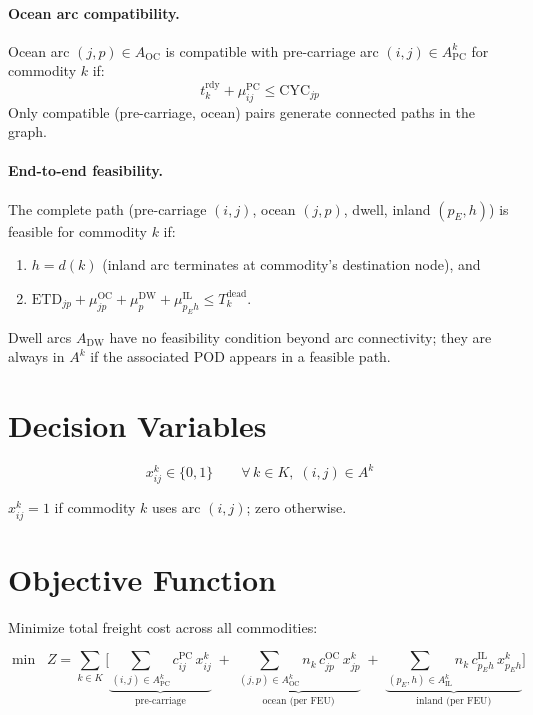 \documentclass[11pt,a4paper]{article}
\theoremstyle{definition}
\begin{document}
\paragraph{Ocean arc compatibility.}
Ocean arc $(j, p) \in A_{\text{OC}}$ is compatible with pre-carriage arc
$(i, j) \in A^k_{\text{PC}}$ for commodity $k$ if:
\[
  t_k^{\text{rdy}} + \mu_{ij}^{\text{PC}} \leq \text{CYC}_{jp}
\]
Only compatible (pre-carriage, ocean) pairs generate connected paths in the graph.

\paragraph{End-to-end feasibility.}
The complete path (pre-carriage $(i,j)$, ocean $(j,p)$, dwell, inland $(p_E, h)$)
is feasible for commodity $k$ if:
\begin{enumerate}[noitemsep]
  \item $h = d(k)$ \quad (inland arc terminates at commodity's destination node), and
  \item $\text{ETD}_{jp} + \mu_{jp}^{\text{OC}} + \mu_p^{\text{DW}} + \mu_{p_E h}^{\text{IL}} \leq T_k^{\text{dead}}$.
\end{enumerate}

Dwell arcs $A_{\text{DW}}$ have no feasibility condition beyond arc connectivity; they are
always in $A^k$ if the associated POD appears in a feasible path.

\section{Decision Variables}

\[
  x_{ij}^k \in \{0, 1\} \qquad \forall\, k \in K,\; (i,j) \in A^k
\]

$x_{ij}^k = 1$ if commodity $k$ uses arc $(i,j)$; zero otherwise.

\section{Objective Function}

Minimize total freight cost across all commodities:

\begin{equation}
  \min \;\; Z = \sum_{k \in K} \Bigg[
    \underbrace{\sum_{(i,j) \in A^k_{\text{PC}}} c_{ij}^{\text{PC}}\, x_{ij}^k}_{\text{pre-carriage}}
    \;+\;
    \underbrace{\sum_{(j,p) \in A^k_{\text{OC}}} n_k\, c_{jp}^{\text{OC}}\, x_{jp}^k}_{\text{ocean (per FEU)}}
    \;+\;
    \underbrace{\sum_{(p_E,h) \in A^k_{\text{IL}}} n_k\, c_{p_E h}^{\text{IL}}\, x_{p_E h}^k}_{\text{inland (per FEU)}}
  \Bigg]
  \label{eq:obj}
\end{equation}
\end{document}
